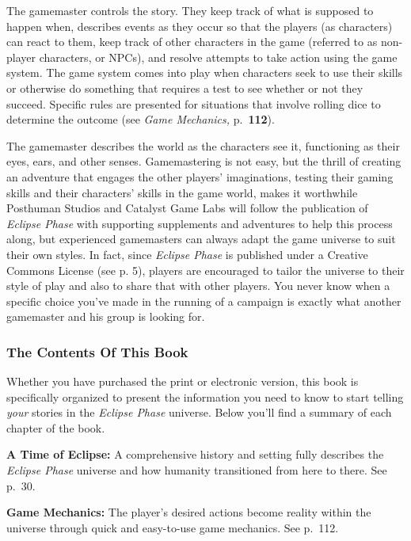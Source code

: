 The gamemaster controls the story. They keep track 
of what is supposed to happen when, describes events 
as they occur so that the players (as characters) can 
react to them, keep track of other characters in the 
game (referred to as non-player characters, or NPCs), 
and resolve attempts to take action using the game 
system. The game system comes into play when characters
seek to use their skills or otherwise do something
that requires a test to see whether or not they
succeed. Specific rules are presented for situations that 
involve rolling dice to determine the outcome (see 
\textit{Game Mechanics,} p. \textbf{112}).

The gamemaster describes the world as the characters
see it, functioning as their eyes, ears, and other
senses. Gamemastering is not easy, but the thrill of 
creating an adventure that engages the other players' 
imaginations, testing their gaming skills and their 
characters' skills in the game world, makes it worthwhile
Posthuman Studios and Catalyst Game Labs
will follow the publication of \textit{Eclipse Phase} with supporting
supplements and adventures to help this process
along, but experienced gamemasters can always
adapt the game universe to suit their own styles. In 
fact, since \textit{Eclipse Phase} is published under a Creative 
Commons License (see p. 5), players are encouraged 
to tailor the universe to their style of play and also 
to share that with other players. You never know 
when a specific choice you've made in the running of 
a campaign is exactly what another gamemaster and 
his group is looking for.

\subsubsection{The Contents Of This Book}

Whether you have purchased the print or electronic 
version, this book is specifically organized to present 
the information you need to know to start telling 
\textit{your} stories in the \textit{Eclipse Phase} universe. Below 
you'll find a summary of each chapter of the book.

\textbf{A Time of Eclipse:} A comprehensive history and setting
fully describes the \textit{Eclipse Phase} universe and how
humanity transitioned from here to there. See p. 30.

\textbf{Game Mechanics:} The player's desired actions 
become reality within the universe through quick and 
easy-to-use game mechanics. See p. 112.


